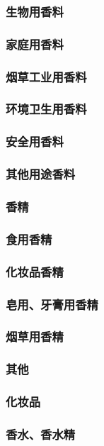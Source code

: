 \documentclass[UTF8]{../../ApplicationUniverse}
\begin{document}
    \subsubsection{生物用香料}
    \subsubsection{家庭用香料}
    \subsubsection{烟草工业用香料}
    \subsubsection{环境卫生用香料}
    \subsubsection{安全用香料}
    \subsubsection{其他用途香料}
\subsubsection{香精}
    \subsubsection{食用香精}
    \subsubsection{化妆品香精}
    \subsubsection{皂用、牙膏用香精}
    \subsubsection{烟草用香精}
    \subsubsection{其他}
\subsubsection{化妆品}
    \subsubsection{香水、香水精}
\end{document}
